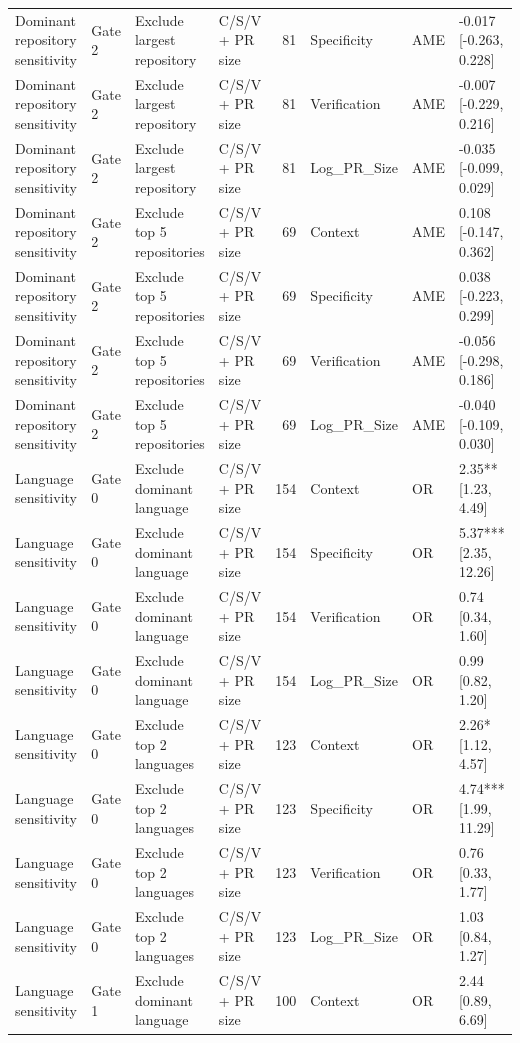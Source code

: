 \begin{table}
\begin{tabular}{llllrlll}
Dominant repository sensitivity & Gate 2 & Exclude largest repository & C/S/V + PR size & 81 & Specificity & AME & -0.017 [-0.263, 0.228] \\
Dominant repository sensitivity & Gate 2 & Exclude largest repository & C/S/V + PR size & 81 & Verification & AME & -0.007 [-0.229, 0.216] \\
Dominant repository sensitivity & Gate 2 & Exclude largest repository & C/S/V + PR size & 81 & Log\_PR\_Size & AME & -0.035 [-0.099, 0.029] \\
Dominant repository sensitivity & Gate 2 & Exclude top 5 repositories & C/S/V + PR size & 69 & Context & AME & 0.108 [-0.147, 0.362] \\
Dominant repository sensitivity & Gate 2 & Exclude top 5 repositories & C/S/V + PR size & 69 & Specificity & AME & 0.038 [-0.223, 0.299] \\
Dominant repository sensitivity & Gate 2 & Exclude top 5 repositories & C/S/V + PR size & 69 & Verification & AME & -0.056 [-0.298, 0.186] \\
Dominant repository sensitivity & Gate 2 & Exclude top 5 repositories & C/S/V + PR size & 69 & Log\_PR\_Size & AME & -0.040 [-0.109, 0.030] \\
Language sensitivity & Gate 0 & Exclude dominant language & C/S/V + PR size & 154 & Context & OR & 2.35** [1.23, 4.49] \\
Language sensitivity & Gate 0 & Exclude dominant language & C/S/V + PR size & 154 & Specificity & OR & 5.37*** [2.35, 12.26] \\
Language sensitivity & Gate 0 & Exclude dominant language & C/S/V + PR size & 154 & Verification & OR & 0.74 [0.34, 1.60] \\
Language sensitivity & Gate 0 & Exclude dominant language & C/S/V + PR size & 154 & Log\_PR\_Size & OR & 0.99 [0.82, 1.20] \\
Language sensitivity & Gate 0 & Exclude top 2 languages & C/S/V + PR size & 123 & Context & OR & 2.26* [1.12, 4.57] \\
Language sensitivity & Gate 0 & Exclude top 2 languages & C/S/V + PR size & 123 & Specificity & OR & 4.74*** [1.99, 11.29] \\
Language sensitivity & Gate 0 & Exclude top 2 languages & C/S/V + PR size & 123 & Verification & OR & 0.76 [0.33, 1.77] \\
Language sensitivity & Gate 0 & Exclude top 2 languages & C/S/V + PR size & 123 & Log\_PR\_Size & OR & 1.03 [0.84, 1.27] \\
Language sensitivity & Gate 1 & Exclude dominant language & C/S/V + PR size & 100 & Context & OR & 2.44 [0.89, 6.69] \\

\end{tabular}
\end{table}
